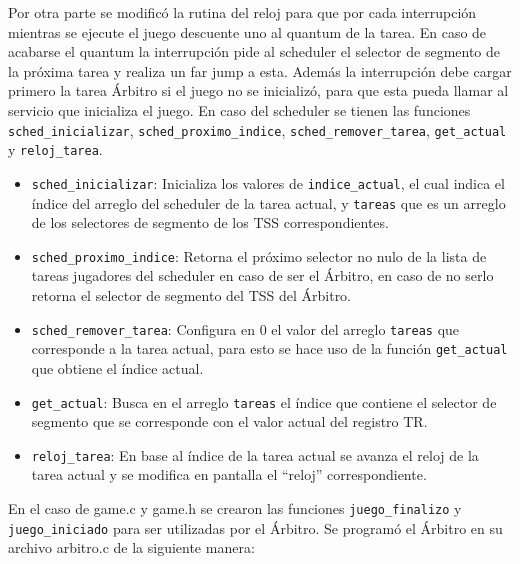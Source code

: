 \documentclass[10pt, a4paper]{article}
\begin{document}
Por otra parte se modific\'o la rutina del reloj para que por cada interrupci\'on mientras se ejecute el juego descuente uno al quantum de la tarea. En caso de acabarse el quantum la interrupci\'on pide al scheduler el selector de segmento de la pr\'oxima tarea y realiza un far jump a esta. Adem\'as la interrupci\'on debe cargar primero la tarea \'Arbitro si el juego no se inicializ\'o, para que esta pueda llamar al servicio que inicializa el juego.\newline
En caso del scheduler se tienen las funciones \verb+sched_inicializar+, \verb+sched_proximo_indice+, \verb+sched_remover_tarea+, \verb+get_actual+ y \verb+reloj_tarea+.
\begin{itemize}
	\item \verb+sched_inicializar+: Inicializa los valores de \verb+indice_actual+, el cual indica el \'indice del arreglo del scheduler de la tarea actual, y \verb+tareas+ que es un arreglo de los selectores de segmento de los TSS correspondientes.
	\item \verb+sched_proximo_indice+: Retorna el pr\'oximo selector no nulo de la lista de tareas jugadores del scheduler en caso de ser el \'Arbitro, en caso de no serlo retorna el selector de segmento del TSS del \'Arbitro.
	\item \verb+sched_remover_tarea+: Configura en $0$ el valor del arreglo \verb+tareas+ que corresponde a la tarea actual, para esto se hace uso de la funci\'on \verb+get_actual+ que obtiene el \'indice actual.
	\item \verb+get_actual+: Busca en el arreglo \verb+tareas+ el \'indice que contiene el selector de segmento que se corresponde con el valor actual del registro TR.
	\item \verb+reloj_tarea+: En base al \'indice de la tarea actual se avanza el reloj de la tarea actual y se modifica en pantalla el ``reloj'' correspondiente.
\end{itemize}

En el caso de game.c y game.h se crearon las funciones \verb+juego_finalizo+ y \verb+juego_iniciado+ para ser utilizadas por el \'Arbitro.\newline
Se program\'o el \'Arbitro en su archivo arbitro.c de la siguiente manera:
\end{document}
